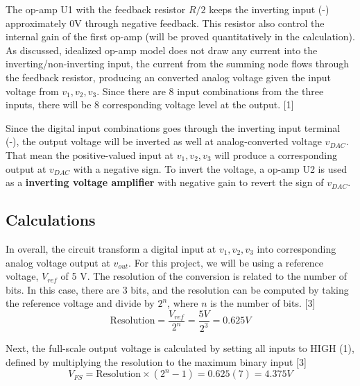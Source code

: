 \documentclass[12pt]{article}
\begin{document}
    The op-amp U1 with the feedback resistor \(R/2\) keeps the inverting input (-) approximately 0V  through negative feedback. This resistor also control the internal gain of the first op-amp (will be proved quantitatively in the calculation). As discussed, idealized op-amp model does not draw any current into the inverting/non-inverting input, the current from the summing node flows through the feedback resistor, producing an converted analog voltage given the input voltage from \(v_1,v_2,v_3\). Since there are 8 input combinations from the three inputs, there will be 8 corresponding voltage level at the output. [1]


    Since the digital input combinations goes through the inverting input terminal (-), the output voltage will be inverted as well at analog-converted voltage \(v_{DAC}\). That mean the positive-valued input at \(v_1,v_2,v_3\) will produce a corresponding output at \(v_{DAC}\) with a negative sign. To invert the voltage, a op-amp U2 is used as a \textbf{inverting voltage amplifier} with negative gain to revert the sign of \(v_{DAC}\). 


    \subsection{Calculations}

     In overall, the circuit transform a digital input at \(v_1,v_2,v_3\) into corresponding analog voltage output at \(v_{out}\). For this project, we will be using a reference voltage, \(V_{ref}\) of 5 V. The resolution of the conversion is related to the number of bits. In this case, there are 3 bits, and the resolution can be computed by taking the reference voltage and divide by \(2^n\), where \(n\) is the number of bits. [3]
     \[\text{Resolution}=\frac{V_{ref}}{2^n}=\frac{5V}{2^3}=0.625V\]

     Next, the full-scale output voltage is calculated by setting all inputs to HIGH (1), defined by multiplying the resolution to the maximum binary input [3]
     \[V_{FS}=\text{Resolution} \times (2^n-1)=0.625(7)=4.375V\]
\end{document}

